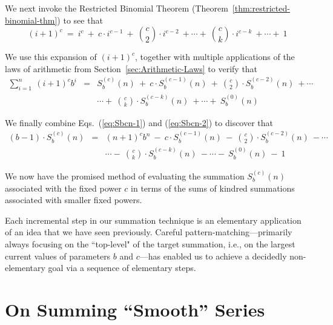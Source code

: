 \smallskip

We next invoke the Restricted Binomial Theorem (Theorem~\ref{thm:restricted-binomial-thm}) to see that
\[ (i+1)^c \ = \ i^c \ + \ c \cdot i^{c-1} \ + \ {c \choose 2} \cdot
i^{c-2} \ + \cdots + \ {c \choose k} \cdot i^{c-k}  \ + \cdots + \ 1
\]

We use this expansion of $(i+1)^c$, together with multiple applications of the laws of arithmetic from Section~\ref{sec:Arithmetic-Laws} to verify that
\begin{eqnarray}
\nonumber
\sum_{i=1}^n \ (i+1)^c b^{i} & = &
S_b^{(c)}(n)
 \ + \ c \cdot S_b^{(c-1)}(n)
 \ + \ {c \choose 2} \cdot S_b^{(c-2)}(n)  \ + \cdots \\
\label{eq:Sbcn-2}
  &  & \cdots + \
{c \choose k} \cdot S_b^{(c-k)}(n)
 \ + \cdots + \
S_b^{(0)}(n)
\end{eqnarray}

\smallskip

%
We finally combine Eqs.~(\ref{eq:Sbcn-1}) and (\ref{eq:Sbcn-2}) to discover that
\begin{eqnarray}
\nonumber
(b-1) \cdot S_b^{(c)}(n)
 & = &
(n+1)^{c} b^{n} \ - \
c \cdot S_b^{(c-1)}(n)
 \ - \ {c \choose 2} \cdot S_b^{(c-2)}(n)  \ - \cdots \\
\label{eq:Sbcn-3}
  &  & 
\cdots - \
{c \choose k} \cdot S_b^{(c-k)}(n)
 \ - \cdots - \
S_b^{(0)}(n)
\ - \ 1
\end{eqnarray}

We now have the promised method of evaluating the summation $S_b^{(c)}(n)$ associated with the fixed power $c$ in terms of the sums of kindred summations associated with smaller fixed powers.

\bigskip

Each incremental step in our summation technique is an elementary application of an idea that we have seen previously.  Careful pattern-matching---primarily always focusing on the ``top-level" of the target summation, i.e., on the largest current values of parameters $b$ and $c$---has enabled us to achieve a decidedly non-elementary goal via a sequence of elementary steps.


\section{On Summing ``Smooth'' Series}
\label{sec:smooth-series}

